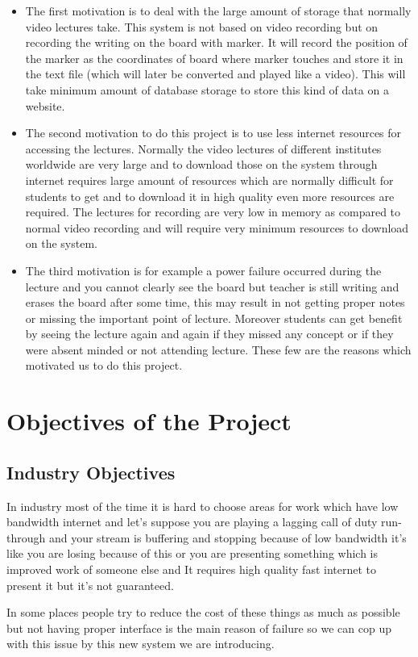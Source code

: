 \begin{itemize}

\item The first motivation is to deal with the large amount of storage that normally video lectures take. This system is not based on video recording but on recording the writing on the board with marker. It will record the position of the marker as the coordinates of board where marker touches and store it in the text file (which will later be converted and played like a video). This will take minimum amount of database storage to store this kind of data on a website.

\item The second motivation to do this project is to use less internet resources for accessing the lectures. Normally the video lectures of different institutes worldwide are very large and to download those on the system through internet requires large amount of resources which are normally difficult for students to get and to download it in high quality even more resources are required. The lectures for recording are very low in memory as compared to normal video recording and will require very minimum resources to download on the system.

\item The third motivation is for example a power failure occurred during the lecture and you cannot clearly see the board but teacher is still writing and erases the board after some time, this may result in not getting proper notes or missing the important point of lecture. Moreover students can get benefit by seeing the lecture again and again if they missed any concept or if they were absent minded or not attending lecture. These few are the reasons which motivated us to do this project.

\end{itemize}


\bigskip
\section{Objectives of the Project}
\bigskip
\subsection{Industry Objectives}
In industry most of the time it is hard to choose areas for work which have low bandwidth internet and let's suppose you are playing a lagging call of duty run-through and your stream is buffering and stopping because of low bandwidth it's like you are losing because of this or you are presenting something which is improved work of someone else and It requires high quality fast internet to present it but it's not guaranteed.
\par In some places people try to reduce the cost of these things as much as possible but not having proper interface is the main reason of failure so we can cop up with this issue by this new system we are introducing.

